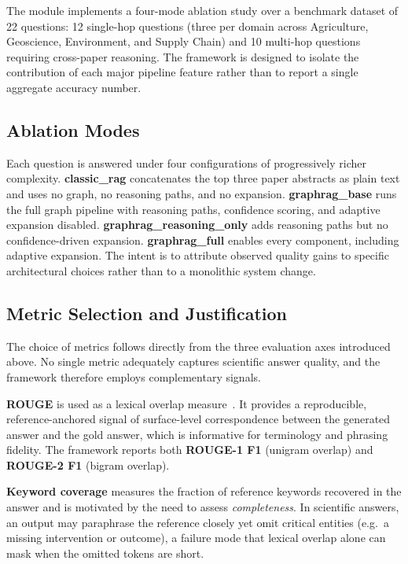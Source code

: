 \documentclass[11pt,a4paper]{article}
\begin{document}
The module implements a four-mode ablation study over a benchmark dataset of
22 questions: 12 single-hop questions (three per domain across Agriculture,
Geoscience, Environment, and Supply Chain) and 10 multi-hop questions
requiring cross-paper reasoning. The framework is designed to isolate the
contribution of each major pipeline feature rather than to report a single
aggregate accuracy number.

\subsection{Ablation Modes}

Each question is answered under four configurations of progressively richer
complexity. \textbf{classic\_rag} concatenates the top three paper abstracts
as plain text and uses no graph, no reasoning paths, and no expansion.
\textbf{graphrag\_base} runs the full graph pipeline with reasoning paths,
confidence scoring, and adaptive expansion disabled.
\textbf{graphrag\_reasoning\_only} adds reasoning paths but no
confidence-driven expansion. \textbf{graphrag\_full} enables every component,
including adaptive expansion. The intent is to attribute observed quality
gains to specific architectural choices rather than to a monolithic system
change.

\subsection{Metric Selection and Justification}

The choice of metrics follows directly from the three evaluation axes
introduced above. No single metric adequately captures scientific answer
quality, and the framework therefore employs complementary signals.

\textbf{ROUGE} is used as a lexical overlap measure~\cite{lin2004rouge}. It
provides a reproducible, reference-anchored signal of surface-level
correspondence between the generated answer and the gold answer, which is
informative for terminology and phrasing fidelity. The framework reports both
\textbf{ROUGE-1 F1} (unigram overlap) and \textbf{ROUGE-2 F1} (bigram overlap).

\textbf{Keyword coverage} measures the fraction of reference keywords
recovered in the answer and is motivated by the need to assess
\emph{completeness}. In scientific answers, an output may paraphrase the
reference closely yet omit critical entities (e.g.\ a missing intervention or
outcome), a failure mode that lexical overlap alone can mask when the omitted
tokens are short.
\end{document}
